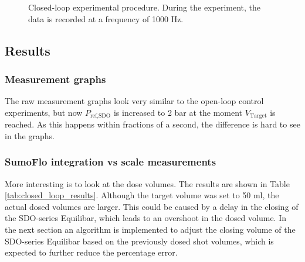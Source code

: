 \documentclass[12pt,a4paper]{article}
\begin{document}
\begin{figure}[ht]
\caption{Closed-loop experimental procedure. During the experiment, the data is recorded at a frequency of 1000 Hz.}
\label{fig:closed_loop_method}
\end{figure}

\newpage
\subsection{Results}
\subsubsection{Measurement graphs}
The raw measurement graphs look very similar to the open-loop control experiments, but now $P_{\text{ref,SDO}}$ is increased to 2 bar at the moment $V_{\text{Target}}$ is reached. As this happens within fractions of a second, the difference is hard to see in the graphs. 

\subsubsection{SumoFlo integration vs scale measurements}
More interesting is to look at the dose volumes. The results are shown in Table \ref{tab:closed_loop_results}. Although the target volume was set to 50 ml, the actual dosed volumes are larger. This could be caused by a delay in the closing of the SDO-series Equilibar, which leads to an overshoot in the dosed volume. In the next section an algorithm is implemented to adjust the closing volume of the SDO-series Equilibar based on the previously dosed shot volumes, which is expected to further reduce the percentage error.
\end{document}
